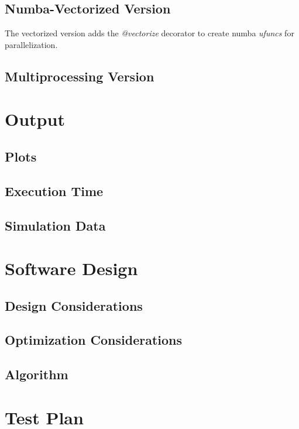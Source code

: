 \documentclass{article}
\begin{document}
\subsection{Numba-Vectorized Version}
The vectorized version adds the \textit{@vectorize} decorator to create numba \textit{ufuncs} for parallelization.


\subsection{Multiprocessing Version}


\section{Output}

\subsection{Plots}

\subsection{Execution Time}

\subsection{Simulation Data}


\section{Software Design}

\subsection{Design Considerations}

\subsection{Optimization Considerations}

\subsection{Algorithm}

\section{Test Plan}
\end{document}
